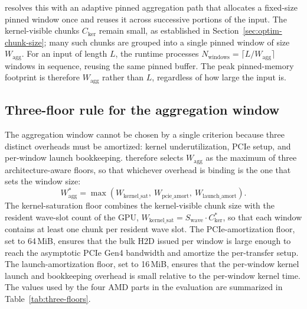 \arcto{} resolves this with an adaptive pinned aggregation path that
allocates a fixed-size pinned window once and reuses it across
successive portions of the input. The kernel-visible chunks
$C_{\text{ker}}$ remain small, as established in
Section~\ref{sec:optim-chunk-size}; many such chunks are grouped into
a single pinned window of size $W_{\text{agg}}$. For an input of
length $L$, the runtime processes
$N_{\text{windows}} = \lceil L / W_{\text{agg}} \rceil$ windows in
sequence, reusing the same pinned buffer. The peak pinned-memory
footprint is therefore $W_{\text{agg}}$ rather than $L$, regardless
of how large the input is.

\subsection{Three-floor rule for the aggregation window}
\label{sec:three-floor-rule}

The aggregation window cannot be chosen by a single criterion because
three distinct overheads must be amortized: kernel underutilization,
PCIe setup, and per-window launch bookkeeping. \arcto{} therefore
selects $W_{\text{agg}}$ as the maximum of three architecture-aware
floors, so that whichever overhead is binding is the one that sets
the window size:
\[
W_{\text{agg}}^{*} =
\max\left(W_{\text{kernel\_sat}},\ W_{\text{pcie\_amort}},\
W_{\text{launch\_amort}}\right).
\]
The kernel-saturation floor combines the kernel-visible chunk size
with the resident wave-slot count of the GPU,
$W_{\text{kernel\_sat}} = S_{\text{wave}} \cdot C_{\text{ker}}^{*}$,
so that each window contains at least one chunk per resident wave
slot. The PCIe-amortization floor, set to 64\,MiB, ensures that the
bulk H2D issued per window is large enough to reach the asymptotic
PCIe Gen4 bandwidth and amortize the per-transfer setup. The
launch-amortization floor, set to 16\,MiB, ensures that the
per-window kernel launch and bookkeeping overhead is small relative
to the per-window kernel time. The values used by the four AMD parts
in the evaluation are summarized in Table~\ref{tab:three-floors}.

